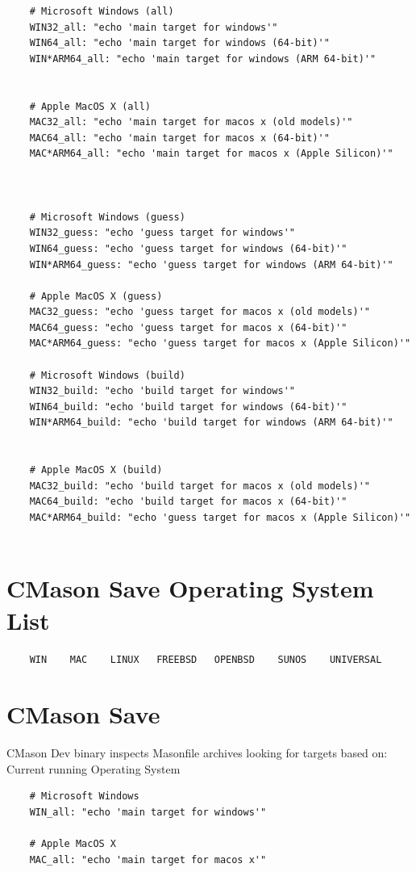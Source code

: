 \documentclass[]{article}
\begin{document}
\begin{verbatim}
	# Microsoft Windows (all)
	WIN32_all: "echo 'main target for windows'"
	WIN64_all: "echo 'main target for windows (64-bit)'"
	WIN*ARM64_all: "echo 'main target for windows (ARM 64-bit)'"
	
	
	# Apple MacOS X (all)
	MAC32_all: "echo 'main target for macos x (old models)'"
	MAC64_all: "echo 'main target for macos x (64-bit)'"
	MAC*ARM64_all: "echo 'main target for macos x (Apple Silicon)'"
	
	
	
	# Microsoft Windows (guess)
	WIN32_guess: "echo 'guess target for windows'"
	WIN64_guess: "echo 'guess target for windows (64-bit)'"
	WIN*ARM64_guess: "echo 'guess target for windows (ARM 64-bit)'"

	# Apple MacOS X (guess)
	MAC32_guess: "echo 'guess target for macos x (old models)'"
	MAC64_guess: "echo 'guess target for macos x (64-bit)'"
	MAC*ARM64_guess: "echo 'guess target for macos x (Apple Silicon)'"
	
	# Microsoft Windows (build)
	WIN32_build: "echo 'build target for windows'"
	WIN64_build: "echo 'build target for windows (64-bit)'"
	WIN*ARM64_build: "echo 'build target for windows (ARM 64-bit)'"
	
	
	# Apple MacOS X (build)
	MAC32_build: "echo 'build target for macos x (old models)'"
	MAC64_build: "echo 'build target for macos x (64-bit)'"
	MAC*ARM64_build: "echo 'guess target for macos x (Apple Silicon)'"
	
\end{verbatim}
\newpage

\section{CMason Save Operating System List}
\begin{verbatim}
	WIN    MAC    LINUX   FREEBSD   OPENBSD    SUNOS    UNIVERSAL
\end{verbatim}


\section{CMason Save}
CMason Dev binary inspects Masonfile archives looking for targets based on: Current running Operating System

\begin{verbatim}
	# Microsoft Windows 
	WIN_all: "echo 'main target for windows'"
	
	# Apple MacOS X
	MAC_all: "echo 'main target for macos x'"
	
\end{verbatim}
\end{document}
